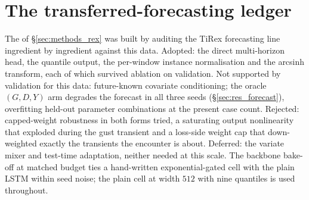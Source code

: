 
\section{The transferred-forecasting ledger}
\label{app:rex_ledger}

The \DirectFC{} of \S\ref{sec:methods_rex} was built by auditing the
TiRex forecasting line \citep{tirex,tirex2} ingredient by ingredient against this
data. Adopted: the direct multi-horizon head, the quantile output, the
per-window instance normalisation and the arcsinh transform, each of which
survived ablation on validation. Not supported by validation for this
data: future-known
covariate conditioning; the oracle $(G, D, Y)$ arm degrades the forecast
in all three seeds (\S\ref{sec:res_forecast}), overfitting held-out
parameter combinations at the present case count. Rejected: capped-weight
robustness in both forms tried, a saturating output nonlinearity that
exploded during the gust transient and a loss-side weight cap that
down-weighted exactly the transients the encounter is about. Deferred:
the variate mixer and test-time adaptation, neither needed at this scale.
The backbone bake-off at matched budget ties a hand-written
exponential-gated cell \citep{xlstm} with the plain LSTM within seed
noise; the plain cell at width $512$ with nine quantiles is used
throughout.
